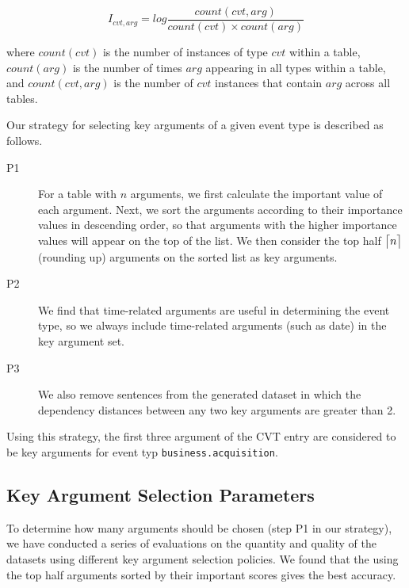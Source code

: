 \begin{equation}
	I_{cvt, arg} = log \frac{count(cvt, arg)}{count(cvt) \times count(arg)}
\end{equation}


where $count(cvt)$ is the number of instances of type $cvt$ within a \CVT table, $count(arg)$ is the number of times $arg$ appearing in all
\CVT types within a \CVT table, and $count(cvt, arg)$ is the number of $cvt$ instances that contain $arg$ across all \CVT tables.


Our strategy for selecting key arguments of a given event type is described as follows.

\begin{description}

\item [P1] For a \CVT table with $n$ arguments, we first calculate the important value of each argument. Next, we sort the arguments
    according to their importance values in descending order, so that arguments with the higher importance values will appear on the top
    of the list. We then consider the top half $\ceil[\big]{n}$ (rounding up) arguments on the sorted list as key arguments.

\item [P2] We find that time-related arguments are useful in determining the event type, so we always include time-related arguments
    (such as date) in the key argument set.

\item [P3] We also remove sentences from the generated dataset in which the dependency distances between any two key arguments are
    greater than 2.

\end{description}

Using this strategy, the first three argument of the CVT entry are considered to be key arguments for event typ
\texttt{business.acquisition}.


\subsection{Key Argument Selection Parameters}
To determine how many arguments should be chosen (step P1 in our strategy), we have conducted a series of evaluations on the quantity and
quality of the datasets using different key argument selection policies. We found that the using the top half arguments sorted by their
important scores gives the best accuracy.


